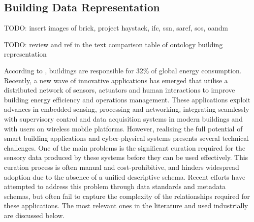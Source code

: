 \subsection*{Building Data Representation}
TODO: insert images of brick, project haystack, ifc, ssn, saref, sos, oandm

TODO: review and ref in the text comparison table of ontology building representation

According to \cite{Balaji2018}, buildings are responsible for 32\% of global energy consumption.
Recently, a new wave of innovative applications has emerged that utilise a distributed network of sensors, actuators and human interactions to improve building energy efficiency and operations management.
These applications exploit advances in embedded sensing, processing and networking, integrating seamlessly with supervisory control and data acquisition systems in modern buildings and with users on wireless mobile platforms.
However, realising the full potential of smart building applications and cyber-physical systems presents several technical challenges.
One of the main problems is the significant curation required for the sensory data produced by these systems before they can be used effectively.
This curation process is often manual and cost-prohibitive, and hinders widespread adoption due to the absence of a unified descriptive schema.
Recent efforts have attempted to address this problem through data standards and metadata schemas, but often fail to capture the complexity of the relationships required for these applications.
The most relevant ones in the literature and used industrially are discussed below.

